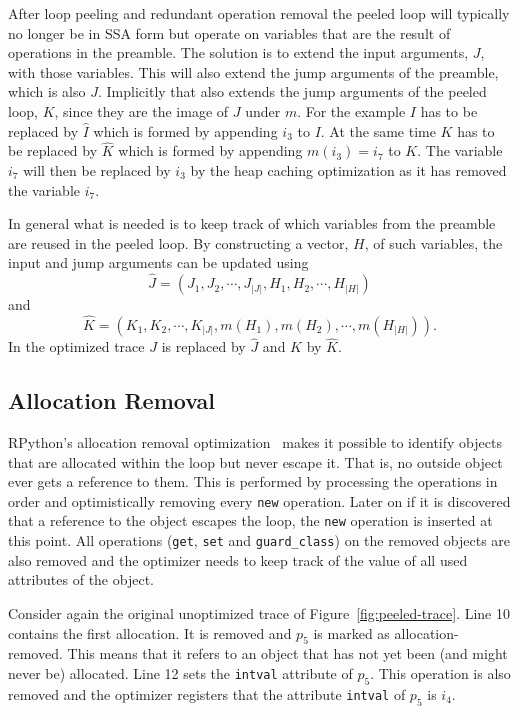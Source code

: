 \documentclass[preprint]{sigplanconf}
\let\oldcite=\cite
\renewcommand\cite[1]{\ifthenelse{\equal{#1}{XXX}}{[citation~needed]}{\oldcite{#1}}}
\begin{document}
After loop peeling and redundant operation removal the peeled loop
will typically no longer be in SSA form but operate on variables that are the result
of operations in the preamble. The solution is to extend the input
arguments, $J$, with those variables. This will also extend the
jump arguments of the preamble, which is also $J$. 
Implicitly that also extends the jump arguments of the peeled loop, $K$,
since they are the image of $J$ under $m$. For the example $I$ has to
be replaced by $\hat I$ which is formed by appending $i_3$ to $I$.
At the same time $K$ has to be replaced by
$\hat K$ which is formed by appending $m\left(i_3\right)=i_7$ to $K$.
The variable $i_7$ will then be replaced by $i_3$ by the heap caching
optimization as it has removed the variable $i_7$.

In general what is needed is to keep track of
which variables from the preamble are reused in the peeled loop.
By constructing a vector, $H$,  of such variables, the input and jump
arguments can be updated using
\begin{equation}
  \hat J = \left(J_1, J_2, \cdots, J_{|J|}, H_1, H_2, \cdots, H_{|H|}\right)
  \label{eq:heap-inputargs}
\end{equation}
and
\begin{equation}
  \hat K = \left(K_1, K_2, \cdots, K_{|J|}, m(H_1), m(H_2), \cdots, m(H_{|H|})\right)
  .
  \label{eq:heap-jumpargs}
\end{equation}
In the optimized trace $J$ is replaced by $\hat J$ and $K$ by $\hat
K$.

\subsection{Allocation Removal}
\label{sub:allocation}

RPython's allocation removal optimization~\cite{bolz_allocation_2011} makes it
possible to identify objects that are allocated within the loop but never
escape it. That is, no outside
object ever gets a reference to them. This
is performed by processing the operations in order and
optimistically removing every \lstinline{new} operation. Later on if
it is discovered that a reference to the object escapes the loop, the
\lstinline{new} operation is inserted at this point. All operations
(\lstinline{get}, \lstinline{set} and \lstinline{guard_class}) on the removed objects
are also removed and the optimizer needs to keep track of the value of all used
attributes of the object.

Consider again the original unoptimized trace of
Figure~\ref{fig:peeled-trace}. Line 10 contains the first
allocation. It is removed and $p_5$ is marked as allocation-removed. This means
that it refers to an object that has not yet been
(and might never be) allocated. Line 12 sets the \lstinline{intval}
attribute of $p_5$. This operation is also removed and the optimizer
registers that the attribute \lstinline{intval} of $p_5$ is $i_4$.
\end{document}
